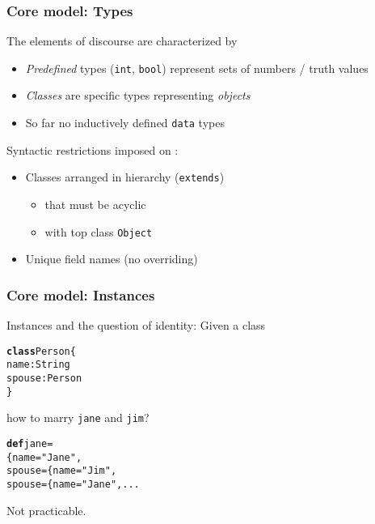 \documentclass{beamer}
\begin{document}
\begin{frame}[fragile]\frametitle{Core model: Types}

  The elements of discourse are characterized by
  \begin{itemize}
  \item \emph{Predefined} types (\texttt{int}, \texttt{bool}) represent sets of
    numbers / truth values
  \item \emph{Classes} are specific types representing \emph{objects}
  \item So far no inductively defined \texttt{data} types
  \end{itemize}

  \vspace{5mm}
  Syntactic restrictions imposed on :
  \begin{itemize}
  \item Classes arranged in hierarchy (\texttt{extends})
    \begin{itemize}
    \item that must be acyclic
    \item with top class \texttt{Object}
    \end{itemize}
  \item Unique field names (no overriding)
  \end{itemize}

\end{frame}


\begin{frame}[fragile]\frametitle{Core model: Instances}

  Instances and the question of identity:   Given a class
\begin{alltt}
\textbf{class} Person \{
      name: String
      spouse: Person
\}
\end{alltt}
how to marry \texttt{jane} and \texttt{jim}?
\begin{alltt}
  \textbf{def} jane =
       \{ name = "Jane",
         spouse = \{ name = "Jim",
                    spouse = \{ name = "Jane", ...
\end{alltt}
Not practicable.

\end{frame}
\end{document}
